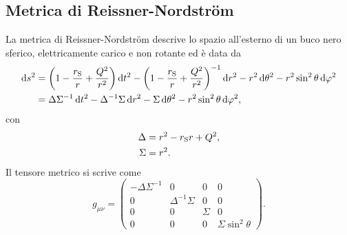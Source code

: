 \subsection{Metrica di Reissner-Nordström}
\label{sec:metrica-reissner}

La metrica di Reissner-Nordström descrive lo spazio all'esterno di un buco nero
sferico, elettricamente carico e non rotante ed è data da
\begin{equation}
  \label{eq:metrica-reissner}
  \begin{split}
    \dd s^{2} &= \biggl(1 - \frac{r_{\textup{S}}}{r} +
    \frac{Q^{2}}{r^{2}}\biggr)\dd t^{2} - \biggl(1 - \frac{r_{\textup{S}}}{r} +
    \frac{Q^{2}}{r^{2}}\biggr)^{-1}\dd r^{2} - r^{2}\dd\theta^{2} -
    r^{2}\sin^{2}\theta\dd\phi^{2} \\
    &= \Delta\Sigma^{-1}\dd t^{2} - \Delta^{-1}\Sigma\dd r^{2} -
    \Sigma\dd\theta^{2} - r^{2}\sin^{2}\theta\dd\phi^{2},
  \end{split}
\end{equation}
con
\begin{subequations}
  \begin{align}
    \Delta &= r^{2} - r_{\textup{S}}r + Q^{2}, \\
    \Sigma &= r^{2}.
  \end{align}
\end{subequations}
Il tensore metrico si scrive come
\begin{equation}
  g_{\mu\nu} =
  \begin{pmatrix}
    -\Delta\Sigma^{-1} & 0                 & 0      & 0 \\
    0                  & \Delta^{-1}\Sigma & 0      & 0 \\
    0                  & 0                 & \Sigma & 0 \\
    0                  & 0                 & 0      & \Sigma\sin^{2}\theta
  \end{pmatrix}.
\end{equation}

